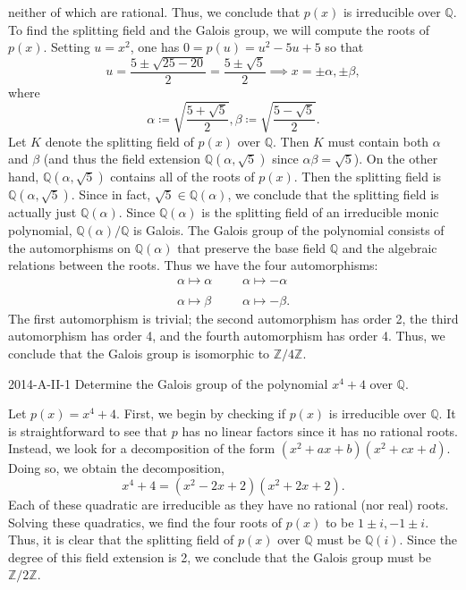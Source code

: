\documentclass{article}
\begin{document}
	neither of which are rational. Thus, we conclude that $p(x)$ is irreducible over $\mathbb{Q}$. To find the splitting field and the Galois group, we will compute the roots of $p(x)$. Setting $u = x^{2}$, one has $0 = p(u) = u^{2} - 5u + 5$ so that 
	\begin{equation*}
		u = \frac{5 \pm \sqrt{25 - 20}}{2} = \frac{5 \pm \sqrt{5}}{2} \implies x = \pm \alpha, \pm \beta, 
	\end{equation*}
	where 
	\begin{equation*}
		\alpha \coloneqq \sqrt{\frac{5 + \sqrt{5}}{2}}, \beta \coloneqq \sqrt{\frac{5 - \sqrt{5}}{2}}. 
	\end{equation*}
	Let $K$ denote the splitting field of $p(x)$ over $\mathbb{Q}$. Then $K$ must contain both $\alpha$ and $\beta$ (and thus the field extension $\mathbb{Q}(\alpha, \sqrt{5})$ since $\alpha \beta = \sqrt{5}$). On the other hand, $\mathbb{Q}(\alpha, \sqrt{5})$ contains all of the roots of $p(x)$. Then the splitting field is $\mathbb{Q}(\alpha, \sqrt{5})$. Since in fact, $\sqrt{5} \in \mathbb{Q}(\alpha)$, we conclude that the splitting field is actually just $\mathbb{Q}(\alpha)$. Since $\mathbb{Q}(\alpha)$ is the splitting field of an irreducible monic polynomial, $\mathbb{Q}(\alpha)/\mathbb{Q}$ is Galois. The Galois group of the polynomial consists of the automorphisms on $\mathbb{Q}(\alpha)$ that preserve the base field $\mathbb{Q}$ and the algebraic relations between the roots. Thus we have the four automorphisms: 
	\begin{equation*}
		\begin{matrix}
			\alpha \mapsto \alpha & & & \alpha \mapsto -\alpha \\
			& & & \\ 
			\alpha \mapsto \beta & & & \alpha \mapsto -\beta.
		\end{matrix}
	\end{equation*}
	The first automorphism is trivial; the second automorphism has order 2, the third automorphism has order 4, and the fourth automorphism has order 4. Thus, we conclude that the Galois group is isomorphic to $\mathbb{Z}/4\mathbb{Z}$. 
	
	
	\begin{prb}{2014-A-II-1}
		Determine the Galois group of the polynomial $x^{4} + 4$ over $\mathbb{Q}$. 
	\end{prb}
	Let $p(x) = x^{4} + 4$. First, we begin by checking if $p(x)$ is irreducible over $\mathbb{Q}$. It is straightforward to see that $p$ has no linear factors since it has no rational roots. Instead, we look for a decomposition of the form $(x^{2} + ax + b)(x^{2} + cx + d)$. Doing so, we obtain the decomposition, 
	\begin{equation*}
		x^{4} + 4 = (x^{2} - 2x +2)(x^{2} + 2x + 2). 
	\end{equation*}
	Each of these quadratic are irreducible as they have no rational (nor real) roots. Solving these quadratics, we find the four roots of $p(x)$ to be $1 \pm i, -1 \pm i$. Thus, it is clear that the splitting field of $p(x)$ over $\mathbb{Q}$ must be $\mathbb{Q}(i)$. Since the degree of this field extension is 2, we conclude that the Galois group must be $\mathbb{Z}/2\mathbb{Z}$. 
	
\end{document}
